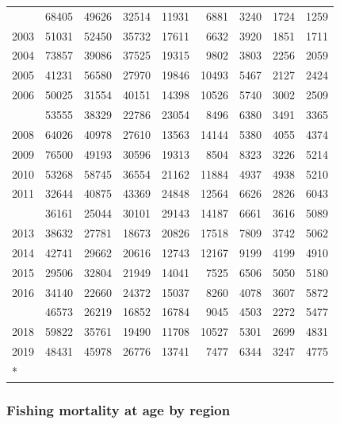 \documentclass[
]{article}
\begin{document}
\begin{longtable}[t]{lrrrrrrrr}
\addlinespace
2002 & 68405 & 49626 & 32514 & 11931 & 6881 & 3240 & 1724 & 1259\\
2003 & 51031 & 52450 & 35732 & 17611 & 6632 & 3920 & 1851 & 1711\\
2004 & 73857 & 39086 & 37525 & 19315 & 9802 & 3803 & 2256 & 2059\\
2005 & 41231 & 56580 & 27970 & 19846 & 10493 & 5467 & 2127 & 2424\\
2006 & 50025 & 31554 & 40151 & 14398 & 10526 & 5740 & 3002 & 2509\\
\addlinespace
2007 & 53555 & 38329 & 22786 & 23054 & 8496 & 6380 & 3491 & 3365\\
2008 & 64026 & 40978 & 27610 & 13563 & 14144 & 5380 & 4055 & 4374\\
2009 & 76500 & 49193 & 30596 & 19313 & 8504 & 8323 & 3226 & 5214\\
2010 & 53268 & 58745 & 36554 & 21162 & 11884 & 4937 & 4938 & 5210\\
2011 & 32644 & 40875 & 43369 & 24848 & 12564 & 6626 & 2826 & 6043\\
\addlinespace
2012 & 36161 & 25044 & 30101 & 29143 & 14187 & 6661 & 3616 & 5089\\
2013 & 38632 & 27781 & 18673 & 20826 & 17518 & 7809 & 3742 & 5062\\
2014 & 42741 & 29662 & 20616 & 12743 & 12167 & 9199 & 4199 & 4910\\
2015 & 29506 & 32804 & 21949 & 14041 & 7525 & 6506 & 5050 & 5180\\
2016 & 34140 & 22660 & 24372 & 15037 & 8260 & 4078 & 3607 & 5872\\
\addlinespace
2017 & 46573 & 26219 & 16852 & 16784 & 9045 & 4503 & 2272 & 5477\\
2018 & 59822 & 35761 & 19490 & 11708 & 10527 & 5301 & 2699 & 4831\\
2019 & 48431 & 45978 & 26776 & 13741 & 7477 & 6344 & 3247 & 4775\\*
\end{longtable}

\subsubsection{Fishing mortality at age by
region}\label{fishing-mortality-at-age-by-region}
\end{document}

